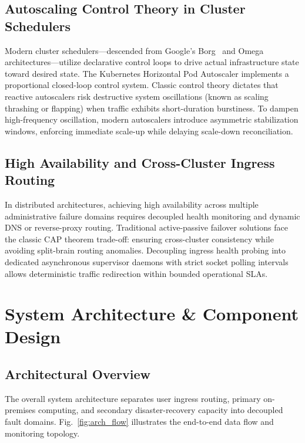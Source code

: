 \documentclass[conference]{IEEEtran}
\begin{document}
\subsection{Autoscaling Control Theory in Cluster Schedulers}
Modern cluster schedulers---descended from Google's Borg~\cite{verma2015} and Omega architectures---utilize declarative control loops to drive actual infrastructure state toward desired state. The Kubernetes Horizontal Pod Autoscaler implements a proportional closed-loop control system. Classic control theory dictates that reactive autoscalers risk destructive system oscillations (known as scaling thrashing or flapping) when traffic exhibits short-duration burstiness. To dampen high-frequency oscillation, modern autoscalers introduce asymmetric stabilization windows, enforcing immediate scale-up while delaying scale-down reconciliation.

\subsection{High Availability and Cross-Cluster Ingress Routing}
In distributed architectures, achieving high availability across multiple administrative failure domains requires decoupled health monitoring and dynamic DNS or reverse-proxy routing. Traditional active-passive failover solutions face the classic CAP theorem trade-off: ensuring cross-cluster consistency while avoiding split-brain routing anomalies. Decoupling ingress health probing into dedicated asynchronous supervisor daemons with strict socket polling intervals allows deterministic traffic redirection within bounded operational SLAs.

\section{System Architecture \& Component Design}

\subsection{Architectural Overview}
The overall system architecture separates user ingress routing, primary on-premises computing, and secondary disaster-recovery capacity into decoupled fault domains. Fig.~\ref{fig:arch_flow} illustrates the end-to-end data flow and monitoring topology.
\end{document}
